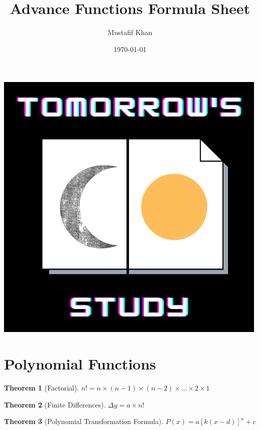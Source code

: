 \documentclass[12pt, letterpaper]{article}
\title{Advance Functions Formula Sheet}
\author{Mustafif Khan}
\date{\today}
\theoremstyle{break}
\newtheorem{theorem}{Theorem}
\begin{document}
\maketitle

\begin{center}
    \includegraphics[scale = 0.5]{TS.png}
\end{center}

\newpage
\tableofcontents
\newpage

\section{Polynomial Functions}
\begin{theorem} [Factorial]
    $n! = n \times (n-1) \times (n-2) \times \dots \times 2 \times 1$
\end{theorem}
%
\begin{theorem}[Finite Differences]
    $\Delta y = a \times n!$
\end{theorem}
%
\begin{theorem}[Polynomial Transformation Formula]
    $P(x)=a[k(x-d)]^n + c$
\end{theorem}
\end{document}
